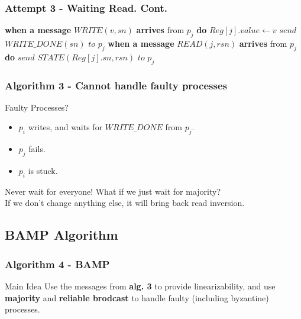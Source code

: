 \begin{frame}[fragile]
    \frametitle{Attempt 3 - Waiting Read. Cont.}
    \begin{algorithm}[H]
        \begin{algorithmic}[0]
        \STATE \textbf{when a message} $WRITE(v, sn)$ \textbf{arrives} from $p_j$ \textbf{do}
        \bindent
            \STATE $Reg[j].value \leftarrow v$
            \STATE $send$ $WRITE\_DONE(sn)$ $to$ $p_j$
        \eindent
        \STATE \textbf{when a message} $READ(j, rsn)$ \textbf{arrives} from $p_j$ \textbf{do}
        \bindent
            \STATE $send$ $STATE(Reg[j].sn, rsn)$ $to$ $p_j$
        \eindent
        
    \end{algorithmic}
        \caption*{}
    \end{algorithm}
\end{frame}

\begin{frame}
    \frametitle{Algorithm 3 - Cannot handle faulty processes}
    \begin{alertblock}{Faulty Processes?}
        \begin{itemize}
            \item $p_i$ writes, and waits for $WRITE\_DONE$ from $p_j$.
            \item $p_j$ fails.
            \item $p_i$ is stuck.
        \end{itemize}
    \end{alertblock}
    \begin{block}{Never wait for everyone!}
        What if we just wait for majority?\\
        If we don't change anything else, it will bring back read inversion.
    \end{block}
\end{frame}

\subsection{BAMP Algorithm}

\begin{frame}
    \frametitle{Algorithm 4 - BAMP}
    \begin{block}{Main Idea}
        Use the messages from \textbf{alg. 3} to provide linearizability,
        and use \textbf{majority} and \textbf{reliable brodcast}
        to handle faulty (including byzantine) processes.
    \end{block}
\end{frame}

